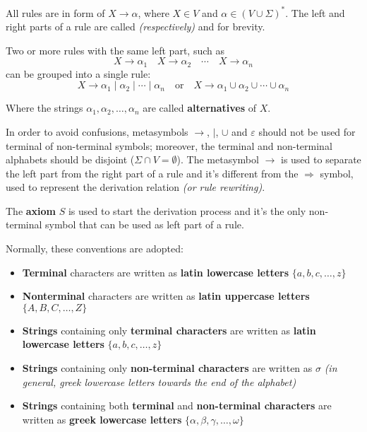 \documentclass[english]{article}
\begin{document}
All rules are in form of \(X \rightarrow \alpha\), where \(X \in V\) and \(\alpha \in (V \cup \Sigma)^\ast\).
The left and right parts of a rule are called \textit{(respectively)} \textbf{\LP} and \textbf{\RP} for brevity.

Two or more rules with the same left part, such as
\[ X \rightarrow \alpha_1 \quad X \rightarrow \alpha_2\quad \cdots \quad X \rightarrow \alpha_n \]
can be grouped into a single rule:
\[ X \rightarrow \alpha_1 \mid \alpha_2 \mid \cdots  \mid \alpha_n \quad \text{or} \quad X \rightarrow \alpha_1 \cup \alpha_2 \cup \cdots \cup \alpha_n \]

Where the strings \(\alpha_1, \alpha_2, \ldots, \alpha_n\) are called \textbf{alternatives} of \(X\).

In order to avoid confusions, metasymbols \(\rightarrow\), \(|\), \(\cup\) and \(\varepsilon\) should not be used for terminal of non-terminal symbols;
moreover, the terminal and non-terminal alphabets should be disjoint (\(\Sigma \cap V = \emptyset\)).
The metasymbol \(\rightarrow\) is used to separate the left part from the right part of a rule and it's different from the \(\Rightarrow\) symbol, used to represent the derivation relation \textit{(or rule rewriting)}.

The \textbf{axiom} \(S\) is used to start the derivation process and it's the only non-terminal symbol that can be used as left part of a rule.

\bigskip
Normally, these conventions are adopted:

\begin{itemize}
  \item \textbf{Terminal} characters are written as \textbf{latin lowercase letters} \(\{a, b, c, \ldots, z\}\)
  \item \textbf{Nonterminal} characters are written as \textbf{latin uppercase letters} \(\{A, B, C, \ldots, Z\}\)
  \item \textbf{Strings} containing only \textbf{terminal characters} are written as \textbf{latin lowercase letters} \(\{a, b, c, \ldots, z\}\)
  \item \textbf{Strings} containing only \textbf{non-terminal characters} are written as \(\sigma\) \textit{(in general, greek lowercase letters towards the end of the alphabet)}
  \item \textbf{Strings} containing both \textbf{terminal} and \textbf{non-terminal characters} are written as \textbf{greek lowercase letters} \(\{\alpha, \beta, \gamma, \ldots, \omega\}\)
\end{itemize}
\end{document}
